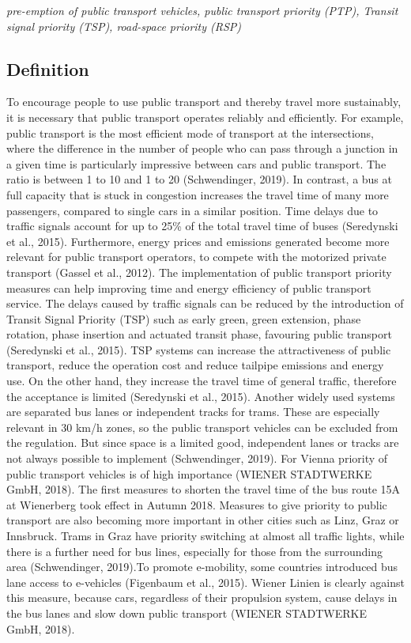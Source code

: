 \documentclass[
]{book}
\begin{document}
\emph{pre-emption of public transport vehicles, public transport priority (PTP), Transit signal priority (TSP), road-space priority (RSP)}

\hypertarget{definition-2}{%
\subsection*{Definition}\label{definition-2}}

To encourage people to use public transport and thereby travel more sustainably, it is necessary that public transport operates reliably and efficiently. For example, public transport is the most efficient mode of transport at the intersections, where the difference in the number of people who can pass through a junction in a given time is particularly impressive between cars and public transport. The ratio is between 1 to 10 and 1 to 20 (Schwendinger, 2019). In contrast, a bus at full capacity that is stuck in congestion increases the travel time of many more passengers, compared to single cars in a similar position. Time delays due to traffic signals account for up to 25\% of the total travel time of buses (Seredynski et al., 2015). Furthermore, energy prices and emissions generated become more relevant for public transport operators, to compete with the motorized private transport (Gassel et al., 2012).
The implementation of public transport priority measures can help improving time and energy efficiency of public transport service. The delays caused by traffic signals can be reduced by the introduction of Transit Signal Priority (TSP) such as early green, green extension, phase rotation, phase insertion and actuated transit phase, favouring public transport (Seredynski et al., 2015). TSP systems can increase the attractiveness of public transport, reduce the operation cost and reduce tailpipe emissions and energy use. On the other hand, they increase the travel time of general traffic, therefore the acceptance is limited (Seredynski et al., 2015). Another widely used systems are separated bus lanes or independent tracks for trams. These are especially relevant in 30 km/h zones, so the public transport vehicles can be excluded from the regulation. But since space is a limited good, independent lanes or tracks are not always possible to implement (Schwendinger, 2019).
For Vienna priority of public transport vehicles is of high importance (WIENER STADTWERKE GmbH, 2018). The first measures to shorten the travel time of the bus route 15A at Wienerberg took effect in Autumn 2018. Measures to give priority to public transport are also becoming more important in other cities such as Linz, Graz or Innsbruck. Trams in Graz have priority switching at almost all traffic lights, while there is a further need for bus lines, especially for those from the surrounding area (Schwendinger, 2019).To promote e-mobility, some countries introduced bus lane access to e-vehicles (Figenbaum et al., 2015). Wiener Linien is clearly against this measure, because cars, regardless of their propulsion system, cause delays in the bus lanes and slow down public transport (WIENER STADTWERKE GmbH, 2018).
\end{document}
